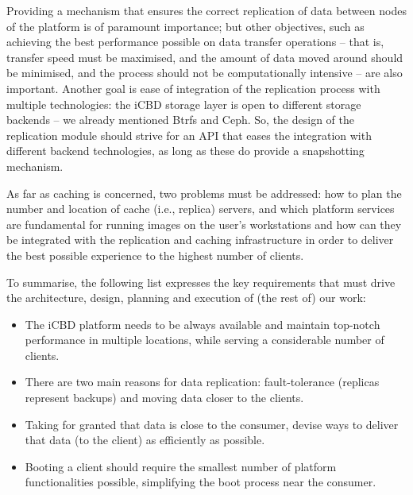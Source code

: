 Providing a mechanism that ensures the correct replication of data between nodes of the platform is of paramount importance; but other objectives, such as achieving the best performance possible on data transfer operations – that is, transfer speed must be maximised, and the amount of data moved around should be minimised, and the process should not be computationally intensive – are also important. Another goal is ease of integration of the replication process with multiple technologies: the iCBD storage layer is open to different storage backends – we already mentioned Btrfs and Ceph. So, the design of the replication module should strive for an API that eases the integration with different backend technologies, as long as these do provide a snapshotting mechanism.

As far as caching is concerned, two problems must be addressed: how to plan the number and location of cache (i.e., replica) servers, and which platform services are fundamental for running images on the user’s workstations and how can they be integrated with the replication and caching infrastructure in order to deliver the best possible experience to the highest number of clients.

To summarise, the following list expresses the key requirements that must drive the architecture, design, planning and execution of (the rest of) our work:

\begin{itemize}
    \item The iCBD platform needs to be always available and maintain top-notch performance in multiple locations, while serving a considerable number of clients.
    \item There are two main reasons for data replication: fault-tolerance (replicas represent backups) and moving data closer to the clients.
    \item Taking for granted that data is close to the consumer, devise ways to deliver that data (to the client) as efficiently as possible.
	\item Booting a client should require the smallest number of platform functionalities possible, simplifying the boot process near the consumer.
\end{itemize}


